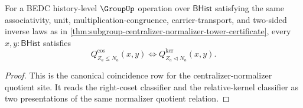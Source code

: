 \begin{theorem}
\label{thm:subgroup-centralizer-normalizer-quotient-classifiers-coincide}
For a BEDC history-level $\GroupUp$ operation over $\mathsf{BHist}$
satisfying the same associativity, unit, multiplication-congruence,
carrier-transport, and two-sided inverse laws as in
\autoref{thm:subgroup-centralizer-normalizer-tower-certificate}, every
$x,y:\mathsf{BHist}$ satisfies
$$
Q^{\mathrm{cos}}_{Z_a\leq N_a}(x,y)\Longleftrightarrow
Q^{\mathrm{ker}}_{Z_a\triangleleft N_a}(x,y).
$$
\end{theorem}
\begin{proof}
This is the canonical coincidence row for the centralizer-normalizer quotient
site. It reads the right-coset classifier and the relative-kernel classifier
as two presentations of the same normalizer quotient relation.
\end{proof}

